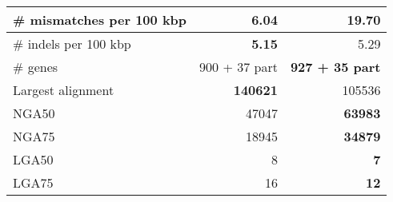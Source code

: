 \documentclass[12pt,a4paper]{article}
\begin{document}
\begin{table}[ht]
\begin{center}
\begin{tabular}{|l*{2}{|r}|}
\# mismatches per 100 kbp & {\bf 6.04} & 19.70 \\ \hline
\# indels per 100 kbp & {\bf 5.15} & 5.29 \\ \hline
\# genes & 900 + 37 part & {\bf 927 + 35 part} \\ \hline
Largest alignment & {\bf 140621} & 105536 \\ \hline
NGA50 & 47047 & {\bf 63983} \\ \hline
NGA75 & 18945 & {\bf 34879} \\ \hline
LGA50 & 8 & {\bf 7} \\ \hline
LGA75 & 16 & {\bf 12} \\ \hline
\end{tabular}
\end{center}
\end{table}
\end{document}
